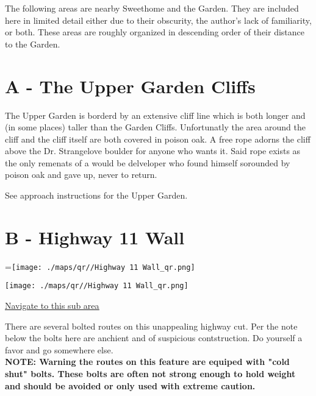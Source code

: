 \raggedcolumns
\begin{multicols}{2}


The following areas are nearby Sweethome and the Garden. They are included here in limited detail either due to their obscurity, the author's lack of familiarity, or both. These areas are roughly organized in descending order of their distance to the Garden.\\



\needspace{6em}

\section{A - The Upper Garden Cliffs}\label{sa:The Upper Garden Cliffs}

The Upper Garden is borderd by an extensive cliff line which is both longer and (in some places) taller than the Garden Cliffs. Unfortunatly the area around the cliff and the cliff itself are both covered in poison oak. A free rope adorns the cliff above the Dr. Strangelove boulder for anyone who wants it. Said rope exists as the only remenats of a would be delveloper who found himself sorounded by poison oak and gave up, never to return.

See approach instructions for the Upper Garden.\\




\vfill\null
\columnbreak

\section{B - Highway 11 Wall}\label{sa:Highway 11 Wall}
=\hbox{\texttt{[image: ./maps/qr//Highway 11 Wall\_qr.png]}}%
\begin{center}
\texttt{[image: ./maps/qr//Highway 11 Wall\_qr.png]}
\end{center}
\begin{center}
\underline{\textcolor{blue}{\href{http://maps.google.com/maps?q=44.45543296270457,-122.54719340682593}{Navigate to this sub area}}}
\end{center}


There are several bolted routes on this unappealing highway cut. Per the note below the bolts here are anchient and of suspicious contstruction. Do yourself a favor and go somewhere else.\\
\textbf{NOTE: Warning the routes on this feature are equiped with "cold shut" bolts. These bolts are often not strong enough to hold weight and should be avoided or only used with extreme caution.}\\





\end{multicols}
